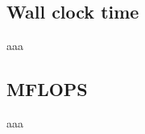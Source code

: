 \documentclass[a4paper]{article}
\begin{document}
\subsection*{Wall clock time}
\begin{minipage}{0.5\linewidth}
    \noindent{}
\end{minipage}\hfill
\begin{minipage}{0.4\linewidth}
aaa
\end{minipage}\hfill
\par\vspace{3ex}
\subsection*{MFLOPS}
\begin{minipage}{0.5\linewidth}
    \noindent{}
\end{minipage}\hfill
\begin{minipage}{0.4\linewidth}
aaa
\end{minipage}\hfill
\end{document}
